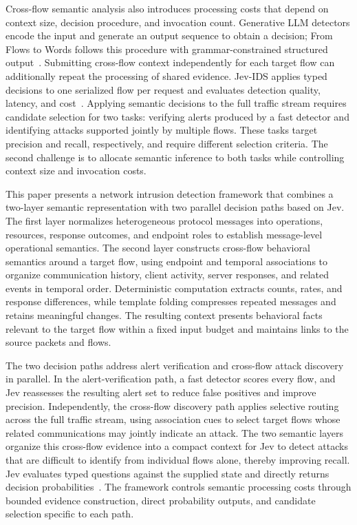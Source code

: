 Cross-flow semantic analysis also introduces processing costs that depend on context size, decision procedure, and invocation count.
Generative LLM detectors encode the input and generate an output sequence to obtain a decision; From Flows to Words follows this procedure with grammar-constrained structured output~\cite{R14}.
Submitting cross-flow context independently for each target flow can additionally repeat the processing of shared evidence.
Jev-IDS applies typed decisions to one serialized flow per request and evaluates detection quality, latency, and cost~\cite{R02}.
Applying semantic decisions to the full traffic stream requires candidate selection for two tasks: verifying alerts produced by a fast detector and identifying attacks supported jointly by multiple flows.
These tasks target precision and recall, respectively, and require different selection criteria.
The second challenge is to allocate semantic inference to both tasks while controlling context size and invocation costs.

This paper presents a network intrusion detection framework that combines a two-layer semantic representation with two parallel decision paths based on Jev.
The first layer normalizes heterogeneous protocol messages into operations, resources, response outcomes, and endpoint roles to establish message-level operational semantics.
The second layer constructs cross-flow behavioral semantics around a target flow, using endpoint and temporal associations to organize communication history, client activity, server responses, and related events in temporal order.
Deterministic computation extracts counts, rates, and response differences, while template folding compresses repeated messages and retains meaningful changes.
The resulting context presents behavioral facts relevant to the target flow within a fixed input budget and maintains links to the source packets and flows.

The two decision paths address alert verification and cross-flow attack discovery in parallel.
In the alert-verification path, a fast detector scores every flow, and Jev reassesses the resulting alert set to reduce false positives and improve precision.
Independently, the cross-flow discovery path applies selective routing across the full traffic stream, using association cues to select target flows whose related communications may jointly indicate an attack.
The two semantic layers organize this cross-flow evidence into a compact context for Jev to detect attacks that are difficult to identify from individual flows alone, thereby improving recall.
Jev evaluates typed questions against the supplied state and directly returns decision probabilities~\cite{R11}.
The framework controls semantic processing costs through bounded evidence construction, direct probability outputs, and candidate selection specific to each path.

